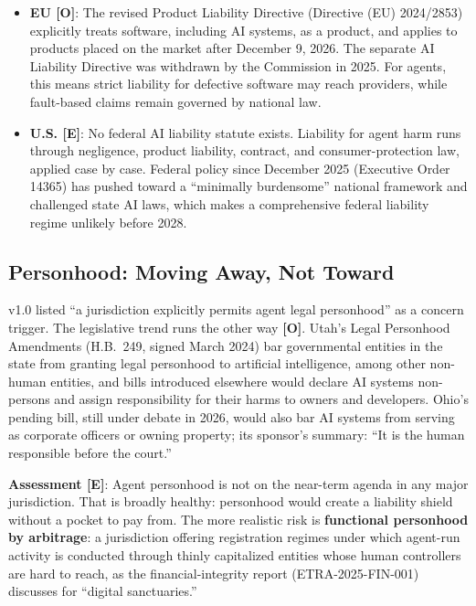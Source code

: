 \documentclass[11pt,letterpaper]{article}
\begin{document}
\begin{itemize}
  \item \textbf{EU [O]}: The revised Product Liability Directive (Directive (EU) 2024/2853) explicitly treats software, including AI systems, as a product, and applies to products placed on the market after December 9, 2026. The separate AI Liability Directive was withdrawn by the Commission in 2025. For agents, this means strict liability for defective software may reach providers, while fault-based claims remain governed by national law.
  \item \textbf{U.S. [E]}: No federal AI liability statute exists. Liability for agent harm runs through negligence, product liability, contract, and consumer-protection law, applied case by case. Federal policy since December 2025 (Executive Order 14365) has pushed toward a ``minimally burdensome'' national framework and challenged state AI laws, which makes a comprehensive federal liability regime unlikely before 2028.
\end{itemize}

\subsection{Personhood: Moving Away, Not Toward}

v1.0 listed ``a jurisdiction explicitly permits agent legal personhood'' as a concern trigger. The legislative trend runs the other way \textbf{[O]}. Utah's Legal Personhood Amendments (H.B.~249, signed March 2024) bar governmental entities in the state from granting legal personhood to artificial intelligence, among other non-human entities, and bills introduced elsewhere would declare AI systems non-persons and assign responsibility for their harms to owners and developers. Ohio's pending bill, still under debate in 2026, would also bar AI systems from serving as corporate officers or owning property; its sponsor's summary: ``It is the human responsible before the court.''

\textbf{Assessment [E]}: Agent personhood is not on the near-term agenda in any major jurisdiction. That is broadly healthy: personhood would create a liability shield without a pocket to pay from. The more realistic risk is \textbf{functional personhood by arbitrage}: a jurisdiction offering registration regimes under which agent-run activity is conducted through thinly capitalized entities whose human controllers are hard to reach, as the financial-integrity report (ETRA-2025-FIN-001) discusses for ``digital sanctuaries.''
\end{document}
